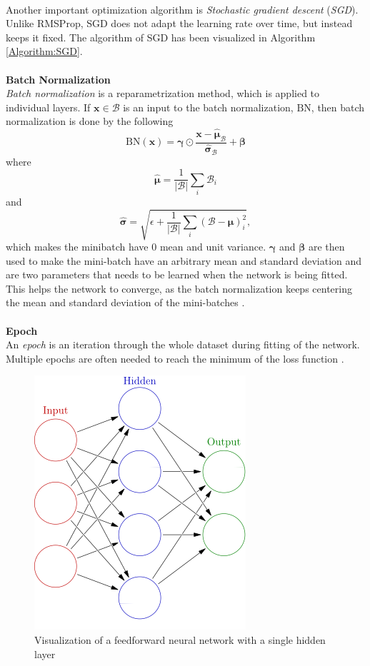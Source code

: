 \documentclass[./main.tex]{subfiles}
\begin{document}
\\
Another important optimization algorithm is \textit{Stochastic gradient descent} (\textit{SGD}). Unlike RMSProp, SGD does not adapt the learning rate over time, but instead keeps it fixed. The algorithm of SGD has been visualized in Algorithm \ref{Algorithm:SGD}. 
\\
\\
\textbf{Batch Normalization} \\
\textit{Batch normalization} is a reparametrization method, which is applied to individual layers. If $\bm{x} \in \mathcal{B}$ is an input to the batch normalization, $\text{BN}$, then batch normalization is done by the following
$$\text{BN}(\bm{x}) = \bm{\gamma} \odot \frac{\bm{x} - \hat{\bm{\mu}}_{\mathcal{B}}}{\hat{\bm{\sigma}}_{\mathcal{B}}} + \bm{\beta}$$
where
$$\hat{\bm{\mu}} = \frac{1}{|\mathcal{B}|} \sum_{i} \mathcal{B}_i$$
and
$$\hat{\bm{\sigma}} = \sqrt{\epsilon + \frac{1}{|\mathcal{B}|} \sum_{i} \left(\mathcal{B} - \bm{\mu} \right)_i ^2 },$$
which makes the minibatch have $0$ mean and unit variance. $\bm{\gamma}$ and $\bm{\beta}$ are then used to make the mini-batch have an arbitrary mean and standard deviation and are two parameters that needs to be learned when the network is being fitted. This helps the network to converge, as the batch normalization keeps centering the mean and standard deviation of the mini-batches \cite{d2l}.
\\
\\
\textbf{Epoch} \\
An \textit{epoch} is an iteration through the whole dataset during fitting of the network. Multiple epochs are often needed to reach the minimum of the loss function \cite{d2l}.
\\
\begin{figure}[htbp]
    \centering
    \includegraphics[height = 5 cm]{entities/feed_forward_nn.jpg}
    \caption{Visualization of a feedforward neural network with a single hidden layer \cite{feedforward_nn}}
    \label{feedforward_nn}
\end{figure}
\end{document}
